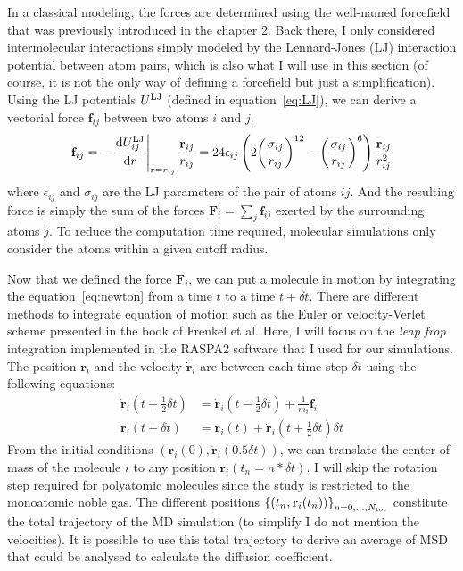 \documentclass[main]{subfiles}
\begin{document}
In a classical modeling, the forces are determined using the well-named forcefield that was previously introduced in the chapter 2. Back there, I only considered intermolecular interactions simply modeled by the Lennard-Jones (LJ) interaction potential between atom pairs, which is also what I will use in this section (of course, it is not the only way of defining a forcefield but just a simplification). Using the LJ potentials $U^{\text{LJ}}$ (defined in equation~\ref{eq:LJ}), we can derive a vectorial force $\mathbf{f}_{ij}$ between two atoms $i$ and $j$.
\begin{equation}
  \mathbf{f}_{ij} = - \left.{\dfrac{\mathop{}\mathopen{}\mathrm{d} U^{\text{LJ}}_{ij}}{\mathop{}\mathopen{}\mathrm{d} r}}\right\rvert_{r=r_{ij}} \frac{\mathbf{r}_{ij}}{r_{ij}} = 24\epsilon_{ij}  \left(2{\left(\dfrac{\sigma_{ij}}{r_{ij}}\right)}^{12} - {\left(\dfrac{\sigma_{ij}}{r_{ij}}\right)}^{6}\right) \frac{\mathbf{r}_{ij}}{r_{ij}^2}
\end{equation}
where $\epsilon_{ij}$ and $\sigma_{ij}$ are the LJ parameters of the pair of atoms $ij$. And the resulting force is simply the sum of the forces $\mathbf{F}_i=\sum_{j}\mathbf{f}_{ij}$ exerted by the surrounding atoms $j$. To reduce the computation time required, molecular simulations only consider the atoms within a given cutoff radius. 

Now that we defined the force $\mathbf{F}_i$, we can put a molecule in motion by integrating the equation~\ref{eq:newton} from a time $t$ to a time $t+\delta t$. There are different methods to integrate equation of motion such as the Euler or velocity-Verlet scheme presented in the book of Frenkel et al.\autocite{frenkel2001md} Here, I will focus on the \emph{leap frop} integration implemented in the RASPA2\autocite{dubbeldam2016} software that I used for our simulations. The position $\mathbf{r}_i$ and the velocity $\dot{\mathbf{r}}_i$ are between each time step $\delta t$ using the following equations:
\begin{equation}\label{eq:frogleap_integration}
  \begin{split}
    \dot{\mathbf{r}}_i\left(t+\tfrac{1}{2}\delta t\right) & = \dot{\mathbf{r}}_i\left(t-\tfrac{1}{2}\delta t\right) + \tfrac{1}{m_i}\mathbf{f}_i \\
    \mathbf{r}_i\left(t+\delta t\right) & = \mathbf{r}_i\left(t\right) + \dot{\mathbf{r}}_i\left(t+\tfrac{1}{2}\delta t\right)\delta t
  \end{split}
\end{equation}
From the initial conditions $(\mathbf{r}_i(0),\dot{\mathbf{r}}_i(0.5\delta t))$, we can translate the center of mass of the molecule $i$ to any position $\mathbf{r}_i(t_n=n*\delta t)$. I will skip the rotation step required for polyatomic molecules since the study is restricted to the monoatomic noble gas. The different positions ${\left\{\left(t_n,\mathbf{r}_i(t_n)\right)\right\}}_{n=0,\ldots,N_{\text{tot}}}$ constitute the total trajectory of the MD simulation (to simplify I do not mention the velocities). It is possible to use this total trajectory to derive an average of MSD that could be analysed to calculate the diffusion coefficient.
\end{document}
